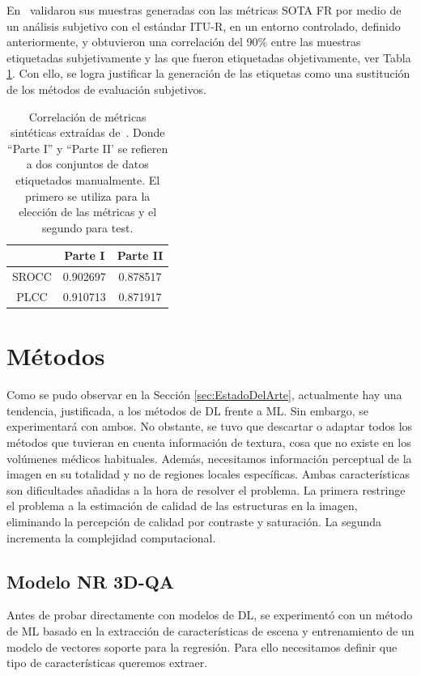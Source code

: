 En~\cite{ResSCNN} validaron sus muestras generadas con las métricas SOTA FR 
por medio de un análisis subjetivo con el estándar ITU-R, en
un entorno controlado, definido anteriormente, y obtuvieron una correlación del 
90\% entre las muestras 
etiquetadas subjetivamente y las que fueron etiquetadas objetivamente, ver Tabla \ref{tab:PseudoCorr}.
Con ello, se logra justificar la generación de las etiquetas como una sustitución 
de los métodos de evaluación subjetivos. 

\begin{table}[H]
  \centering 
  \scriptsize
  \begin{tabular}{|c|c|c|}
    \hline
    \rowcolor[HTML]{FFC702}
     & \textbf{Parte I} & \textbf{Parte II} \\
    \hline 
    SROCC & 0.902697 & 0.878517\\
    \hline
    PLCC & 0.910713 & 0.871917\\
    \hline
  \end{tabular}
  \caption[Correlación de métricas sintéticas.]{
  Correlación de métricas sintéticas extraídas de~\cite{ResSCNN}.
  Donde ``Parte I'' y ``Parte II' se refieren a dos conjuntos de datos etiquetados 
  manualmente. El primero se utiliza para la elección de las métricas y el segundo 
  para test.
}
  \label{tab:PseudoCorr}
\end{table}


\section{Métodos}
Como se pudo observar en la Sección \ref{sec:EstadoDelArte}, actualmente hay una 
tendencia, justificada, a los métodos de DL frente a ML. Sin embargo, se experimentará con 
ambos. No obstante, se tuvo 
que descartar o adaptar todos los métodos que tuvieran en cuenta información de textura, 
cosa que no existe en los volúmenes médicos habituales. Además, necesitamos 
información perceptual de la imagen en su totalidad y no de regiones locales 
específicas. Ambas características son dificultades añadidas a la hora 
de resolver el problema. La primera restringe el problema 
a la estimación de calidad de las estructuras en la imagen, eliminando la 
percepción de calidad por contraste y saturación. La segunda incrementa 
la complejidad computacional. 

\subsection{Modelo NR 3D-QA}
\label{sec:NR3DQA}
Antes de probar directamente con modelos de DL, se experimentó con un método de 
ML basado en la extracción de características de escena y entrenamiento de un 
modelo de vectores soporte para la regresión. Para ello necesitamos definir 
que tipo de características queremos extraer. 

